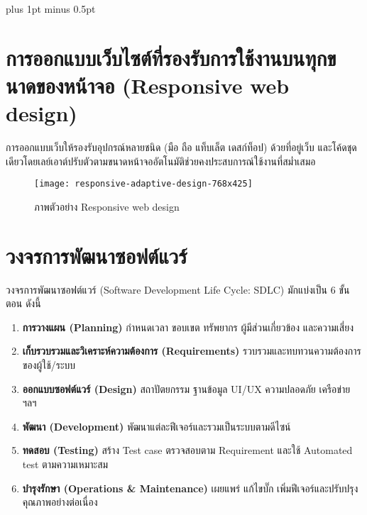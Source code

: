 
\clearpage
\thispagestyle{plain}

\begingroup
\fontsize{16pt}{19.2pt}\selectfont
\justifying
\XeTeXlinebreakskip=0pt plus 1pt minus 0.5pt
\setlength{\parindent}{1.5cm}
\setlength{\parskip}{0pt}

\section*{การออกแบบเว็บไซต์ที่รองรับการใช้งานบนทุกขนาดของหน้าจอ (Responsive web design)}

\indent \cite{kinsta2024responsive} การออกแบบเว็บให้รองรับอุปกรณ์หลายชนิด (มือ ถือ แท็บเล็ต เดสก์ท็อป) ด้วยที่อยู่เว็บ
และโค้ดชุดเดียวโดยเลย์เอาต์ปรับตัวตามขนาดหน้าจออัตโนมัติช่วยคงประสบการณ์ใช้งานที่สม่ำเสมอ

\begin{figure}[h]
	\centering
	\texttt{[image: responsive-adaptive-design-768x425]}
	\caption{ภาพตัวอย่าง Responsive web design}
\end{figure}



\section*{วงจรการพัฒนาซอฟต์แวร์}

\indent วงจรการพัฒนาซอฟต์แวร์ (Software Development Life Cycle: SDLC) มักแบ่งเป็น 6
ขั้นตอน ดังนี้

\begin{enumerate}
	\item \textbf{การวางแผน (Planning)} กำหนดเวลา ขอบเขต ทรัพยากร ผู้มีส่วนเกี่ยวข้อง และความเสี่ยง
	\item \textbf{เก็บรวบรวมและวิเคราะห์ความต้องการ (Requirements)} รวบรวมและทบทวนความต้องการของผู้ใช้/ระบบ
	\item \textbf{ออกแบบซอฟต์แวร์ (Design)} สถาปัตยกรรม ฐานข้อมูล UI/UX ความปลอดภัย เครือข่าย ฯลฯ
	\item \textbf{พัฒนา (Development)} พัฒนาแต่ละฟีเจอร์และรวมเป็นระบบตามดีไซน์
	\item \textbf{ทดสอบ (Testing)} สร้าง Test case ตรวจสอบตาม Requirement และใช้ Automated test ตามความเหมาะสม
	\item \textbf{บำรุงรักษา (Operations \& Maintenance)} เผยแพร่ แก้ไขบั๊ก เพิ่มฟีเจอร์และปรับปรุง คุณภาพอย่างต่อเนื่อง
\end{enumerate}